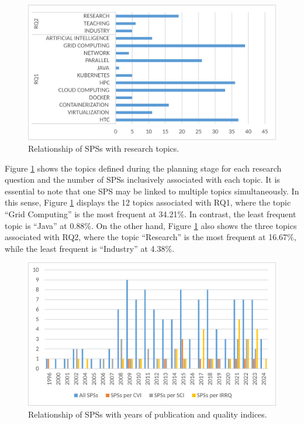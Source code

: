 \begin{figure}[ht]
	\centering
	\includegraphics[scale=0.179]{resources/figures/Imagen3.eps}
	\caption{Relationship of SPSs with research topics.}
	\label{fig:SPSsByTopics}
\end{figure}

Figure \ref{fig:SPSsByTopics} shows the topics defined during the planning stage for each research question and the number of SPSs inclusively associated with each topic. It is essential to note that one SPS may be linked to multiple topics simultaneously. In this sense, Figure \ref{fig:SPSsByTopics} displays the 12 topics associated with RQ1, where the topic ``Grid Computing'' is the most frequent at 34.21\%. In contrast, the least frequent topic is ``Java'' at 0.88\%. On the other hand, Figure \ref{fig:SPSsByTopics} also shows the three topics associated with RQ2, where the topic ``Research'' is the most frequent at 16.67\%, while the least frequent is ``Industry'' at 4.38\%.

\begin{figure}[ht]
	\centering
	\includegraphics[scale=0.179]{resources/figures/Imagen4.eps}
	\caption{Relationship of SPSs with years of publication and quality indices.}
	\label{fig:SPSsByYearsAndIndexes}
\end{figure}

